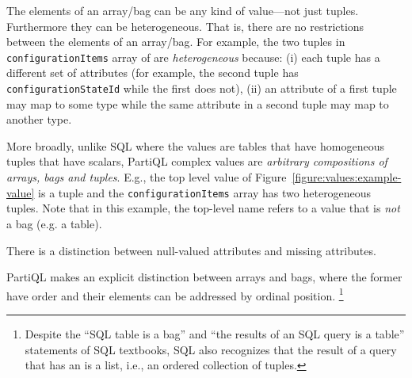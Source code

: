 \begin{compact_enum}
\item The elements of an array/bag can be any kind of value---not just tuples.
Furthermore they can be heterogeneous. That is, there are no restrictions
between the elements of an array/bag. For example, the two tuples in
\texttt{configurationItems} array of are \textit{heterogeneous} because: (i)
each tuple has a different set of attributes (for example, the second tuple has
\texttt{configurationStateId} while the first does not), (ii) an attribute of a
first tuple may map to some type while the same attribute in a second tuple may
map to another type.

\item More broadly, unlike SQL where the values are tables that have homogeneous
tuples that have scalars, PartiQL complex values are {\em arbitrary compositions
of arrays, bags and tuples}. E.g., the top level value of
Figure~\ref{figure:values:example-value} is a tuple and the
\texttt{configurationItems} array has two heterogeneous tuples. Note that in
this example, the top-level name refers to a value that is \textit{not} a bag
(e.g. a table).

\item There is a distinction between null-valued attributes and missing
attributes. 



\item PartiQL makes an explicit distinction between arrays and bags, where the
former have order and their elements can be addressed by ordinal position.
\footnote{Despite the ``SQL table is a bag'' and ``the results of an SQL query
is a table'' statements of SQL textbooks, SQL also recognizes that the result of
a query that has an  is a list, i.e., an ordered collection of
tuples.}
\end{compact_enum}

